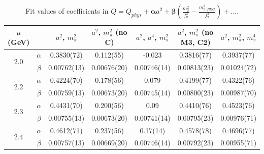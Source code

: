 \documentclass[12pt]{extarticle}
\begin{document}
\begin{table}[h!]
\begin{center}
\begin{tabular}{|c c|c|c|c|c|c|}
\hline
$\mu$ (GeV) &  & $a^2$, $m_\pi^2$& $a^2$, $m_\pi^2$ (no C)& $a^2$, $a^4$, $m_\pi^2$& $a^2$, $m_\pi^2$ (no M3, C2)& $a^2$, $m_\pi^2$, $m_\pi^4$\\
\hline
\multirow{2}{0.5in}{2.0} & $\alpha$ & 0.3830(72)& 0.112(55)& -0.023& 0.3816(77)& 0.3937(77)\\
 & $\beta$ & 0.00762(13)& 0.00676(20)& 0.00746(14)& 0.00813(23)& 0.01024(72)\\
\hline
\multirow{2}{0.5in}{2.2} & $\alpha$ & 0.4224(70)& 0.178(56)& 0.079& 0.4199(77)& 0.4322(76)\\
 & $\beta$ & 0.00759(13)& 0.00673(20)& 0.00745(14)& 0.00800(23)& 0.00987(70)\\
\hline
\multirow{2}{0.5in}{2.3} & $\alpha$ & 0.4431(70)& 0.200(56)& 0.09& 0.4410(76)& 0.4523(76)\\
 & $\beta$ & 0.00755(13)& 0.00673(20)& 0.00741(14)& 0.00795(23)& 0.00976(71)\\
\hline
\multirow{2}{0.5in}{2.4} & $\alpha$ & 0.4612(71)& 0.237(56)& 0.17(14)& 0.4578(78)& 0.4696(77)\\
 & $\beta$ & 0.00757(13)& 0.00669(20)& 0.00746(14)& 0.00792(23)& 0.00955(71)\\
\hline
\end{tabular}
\caption{Fit values of coefficients in $Q = Q_{phys} + \mathbf{\alpha} a^2 + \mathbf{\beta}\left(\frac{m_\pi^2}{f_\pi^2}-\frac{m_{\pi,PDG}^2}{f_\pi^2}\right) + \ldots$.}
\end{center}
\end{table}




















\clearpage
\end{document}
